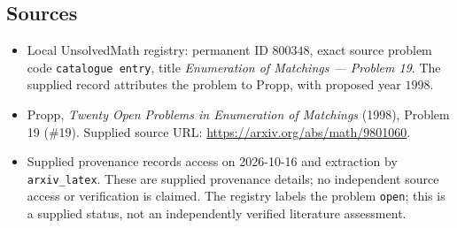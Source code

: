 \documentclass[11pt]{article}
\begin{document}
\subsection{Sources}
\begin{itemize}
\item Local UnsolvedMath registry: permanent ID \(800348\), exact source problem code \texttt{catalogue entry}, title \emph{Enumeration of Matchings --- Problem 19}. The supplied record attributes the problem to Propp, with proposed year \(1998\).
\item Propp, \emph{Twenty Open Problems in Enumeration of Matchings} (1998), Problem 19 (\#19). Supplied source URL: \url{https://arxiv.org/abs/math/9801060}.
\item Supplied provenance records access on 2026-10-16 and extraction by \texttt{arxiv\_latex}. These are supplied provenance details; no independent source access or verification is claimed. The registry labels the problem \texttt{open}; this is a supplied status, not an independently verified literature assessment.
\end{itemize}
\end{document}
